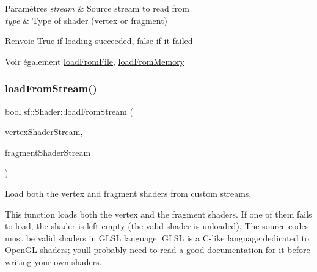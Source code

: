 \begin{DoxyParams}{Paramètres}
{\em stream} & Source stream to read from \\
\hline
{\em type} & Type of shader (vertex or fragment)\\
\hline
\end{DoxyParams}
\begin{DoxyReturn}{Renvoie}
True if loading succeeded, false if it failed
\end{DoxyReturn}
\begin{DoxySeeAlso}{Voir également}
\hyperlink{classsf_1_1Shader_a053a5632848ebaca2fcd8ba29abe9e6e}{load\+From\+File}, \hyperlink{classsf_1_1Shader_ac92d46bf71dff2d791117e4e472148aa}{load\+From\+Memory} 
\end{DoxySeeAlso}
\mbox{\label{classsf_1_1Shader_a3b7958159ffb5596c4babc3052e35465}} 
\subsubsection{\texorpdfstring{load\+From\+Stream()}{loadFromStream()}\hspace{0.1cm}{\footnotesize\ttfamily [2/2]}}
{\footnotesize\ttfamily bool sf\+::\+Shader\+::load\+From\+Stream (\begin{DoxyParamCaption}\item[{\hyperlink{classsf_1_1InputStream}{Input\+Stream} \&}]{vertex\+Shader\+Stream,  }\item[{\hyperlink{classsf_1_1InputStream}{Input\+Stream} \&}]{fragment\+Shader\+Stream }\end{DoxyParamCaption})}



Load both the vertex and fragment shaders from custom streams. 

This function loads both the vertex and the fragment shaders. If one of them fails to load, the shader is left empty (the valid shader is unloaded). The source codes must be valid shaders in G\+L\+SL language. G\+L\+SL is a C-\/like language dedicated to Open\+GL shaders; you\textquotesingle{}ll probably need to read a good documentation for it before writing your own shaders.


